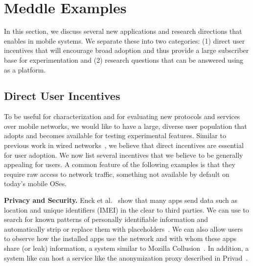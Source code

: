 \vspace{-0.7em}
\section{Meddle Examples}
\label{sec:apps}

In this section, we discuss several new applications and research directions that \meddle enables 
in mobile systems. We separate these into two categories: (1) direct user incentives that 
will encourage broad adoption and thus provide a large subscriber base for 
experimentation and (2) research questions that can be answered using \meddle as a platform.

\subsection{Direct User Incentives}
To be useful for characterization and for evaluating new protocols and services over mobile networks, 
we would like to have a large, diverse user population that adopts \meddle and becomes available 
for testing experimental features. Similar to previous work in wired networks~\cite{choffnes:ono}, we 
believe that direct incentives are essential for user adoption. We now list several incentives that 
we believe to be generally appealing for users. A common feature of the following examples is 
that they require raw access to network traffic, something not available by default on today's mobile OSes.

\noindent\textbf{Privacy and Security.} Enck et al.~\cite{enck:taintdroid} show that many apps send data such as location and unique identifiers (IMEI) in the clear to third parties. We can use \meddle to search for known patterns of personally identifiable information and automatically strip or replace them with placeholders~\cite{hornyack:appfence}. We can also allow users to observe how the installed apps use the network and with whom these apps share (or leak) information, a system similar to Mozilla Collusion~\cite{collusion}. In addition, a system like \meddle can host a service like the anonymization proxy described in Privad~\cite{guha:privad}. 



